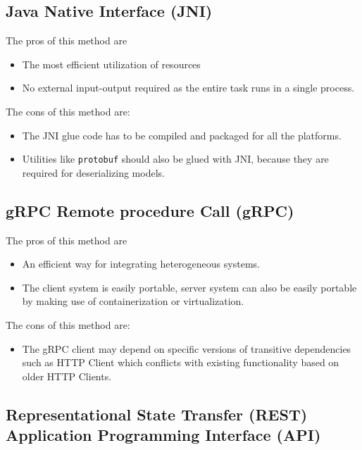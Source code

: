 \documentclass[letterpaper, 10 pt, conference]{ieeeconf}  %
\begin{document}
\subsection{Java Native Interface (JNI)} \label{sec:eval-jni}

The pros of this method are 
\begin{itemize}
\item The most efficient utilization of resources
\item No external input-output required as the entire task runs in a single process.
\end{itemize}

The cons of this method are:
\begin{itemize}
  \item The JNI glue code has to be compiled and packaged for all the platforms.
  \item Utilities like \texttt{protobuf} should also be glued with JNI, because they are required for deserializing models\cite{javacpp-240}. 
\end{itemize}

\subsection{gRPC Remote procedure Call (gRPC)} \label{sec:eval-rpc}

The pros of this method are 
\begin{itemize}
\item An efficient way for integrating heterogeneous systems.
\item The client system is easily portable, server system can also be easily portable by making use of containerization or virtualization.
\end{itemize}

The cons of this method are:
\begin{itemize}
  \item The gRPC client may depend on specific versions of transitive dependencies such as HTTP Client which conflicts with existing functionality based on older HTTP Clients.
\end{itemize}

\subsection{Representational State Transfer (REST) Application Programming Interface (API)} \label{sec:eval-rest}
\end{document}
